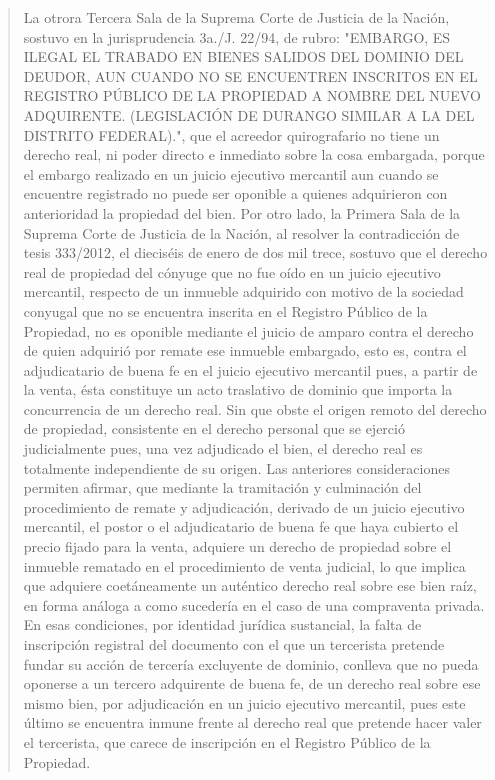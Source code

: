 \documentclass[11pt,a4paper]{article}
\begin{document}
\begin{quote}
La otrora Tercera Sala de la Suprema Corte de Justicia de la Nación, sostuvo en la jurisprudencia
3a./J. 22/94, de rubro: "EMBARGO, ES ILEGAL EL TRABADO EN BIENES SALIDOS DEL
DOMINIO DEL DEUDOR, AUN CUANDO NO SE ENCUENTREN INSCRITOS EN EL REGISTRO
PÚBLICO DE LA PROPIEDAD A NOMBRE DEL NUEVO ADQUIRENTE. (LEGISLACIÓN DE
DURANGO SIMILAR A LA DEL DISTRITO FEDERAL).", que el acreedor quirografario no tiene un
derecho real, ni poder directo e inmediato sobre la cosa embargada, porque el embargo realizado
en un juicio ejecutivo mercantil aun cuando se encuentre registrado no puede ser oponible a
quienes adquirieron con anterioridad la propiedad del bien. Por otro lado, la Primera Sala de la
Suprema Corte de Justicia de la Nación, al resolver la contradicción de tesis 333/2012, el dieciséis
de enero de dos mil trece, sostuvo que el derecho real de propiedad del cónyuge que no fue oído en
un juicio ejecutivo mercantil, respecto de un inmueble adquirido con motivo de la sociedad conyugal
que no se encuentra inscrita en el Registro Público de la Propiedad, no es oponible mediante el
juicio de amparo contra el derecho de quien adquirió por remate ese inmueble embargado, esto es,
contra el adjudicatario de buena fe en el juicio ejecutivo mercantil pues, a partir de la venta, ésta
constituye un acto traslativo de dominio que importa la concurrencia de un derecho real. Sin que
obste el origen remoto del derecho de propiedad, consistente en el derecho personal que se ejerció
judicialmente pues, una vez adjudicado el bien, el derecho real es totalmente independiente de su
origen. Las anteriores consideraciones permiten afirmar, que mediante la tramitación y culminación
del procedimiento de remate y adjudicación, derivado de un juicio ejecutivo mercantil, el postor o el
adjudicatario de buena fe que haya cubierto el precio fijado para la venta, adquiere un derecho de
propiedad sobre el inmueble rematado en el procedimiento de venta judicial, lo que implica que
adquiere coetáneamente un auténtico derecho real sobre ese bien raíz, en forma análoga a como
sucedería en el caso de una compraventa privada. En esas condiciones, por identidad jurídica
sustancial, la falta de inscripción registral del documento con el que un tercerista pretende fundar su
acción de tercería excluyente de dominio, conlleva que no pueda oponerse a un tercero adquirente
de buena fe, de un derecho real sobre ese mismo bien, por adjudicación en un juicio ejecutivo
mercantil, pues este último se encuentra inmune frente al derecho real que pretende hacer valer el
tercerista, que carece de inscripción en el Registro Público de la Propiedad.


\end{quote}
\end{document}
